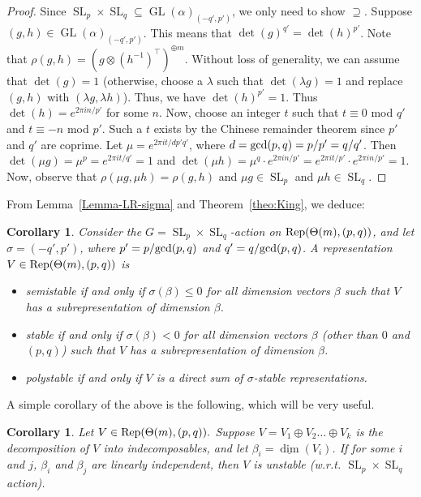 \documentclass[11pt]{amsart}
\newtheorem{corollary}[theorem]{Corollary}
\theoremstyle{definition}
\newcommand{\Rep}{{\rm Rep}}
\newcommand{\GL}{\operatorname{GL}}
\newcommand{\SL}{\operatorname{SL}}
\begin{document}
\begin{proof}
Since $\SL_p \times \SL_q \subseteq \GL(\alpha)_{(-q',p')}$, we only need to show $\supseteq$. Suppose $(g,h) \in \GL(\alpha)_{(-q',p')}$. This means that $\det(g)^{q'} = \det(h)^{p'}$. Note that $\rho(g,h) = (g \otimes (h^{-1})^\top)^{\oplus m}$. Without loss of generality, we can assume that $\det(g) = 1$ (otherwise, choose a $\lambda$ such that $\det(\lambda g ) = 1$ and replace $(g,h)$ with $(\lambda g, \lambda h)$). Thus, we have $\det(h)^{p'} = 1$. Thus $\det(h) = e^{2 \pi i n/p'}$ for some $n$. Now, choose an integer $t$ such that $t \equiv 0$ mod $q'$ and $t \equiv -n$ mod $p'$. Such a $t$ exists by the Chinese remainder theorem since $p'$ and $q'$ are coprime. Let $\mu = e^{2\pi i t/dp'q'}$, where $d = {\rm gcd}(p,q) = p/p' = q/q'$. Then $\det(\mu g) = \mu^p = e^{2\pi i t/q'} = 1$ and $\det(\mu h) = \mu^{q} \cdot e^{2\pi i n/p'}= e^{2\pi i t/p'}\cdot e^{2\pi i n/p'} = 1$. Now, observe that $\rho(\mu g, \mu h) = \rho(g,h)$ and $\mu g \in \SL_p$ and $\mu h \in \SL_q$.



\end{proof}


From Lemma~\ref{Lemma-LR-sigma} and Theorem~\ref{theo:King}, we deduce:


\begin{corollary}
Consider the $G = \SL_p \times \SL_q$-action on $\Rep(\Theta(m),(p,q))$, and let $\sigma = (-q',p')$, where $p' = p/{\rm gcd}(p,q)$ and $q' = q/{\rm gcd}(p,q)$. A representation $V \in \Rep(\Theta(m),(p,q))$ is 
\begin{itemize}
\item semistable if and only if $\sigma(\beta) \leq 0$ for all dimension vectors $\beta$ such that $V$ has a subrepresentation of dimension $\beta$.
\item stable if and only if $\sigma(\beta) < 0$ for all dimension vectors $\beta$ (other than $0$ and $(p,q)$) such that $V$ has a subrepresentation of dimension $\beta$.
\item polystable if and only if $V$ is a direct sum of $\sigma$-stable representations.
\end{itemize}
\end{corollary}

A simple corollary of the above is the following, which will be very useful.

\begin{corollary} \label{lin.ind.unstable}
Let $V \in \Rep(\Theta(m), (p,q)).$ Suppose $V = V_1 \oplus V_2 \dots \oplus V_k$ is the decomposition of $V$ into indecomposables, and let $\beta_i = \underline{\dim}(V_i)$. If for some $i$ and $j$, $\beta_i$ and $\beta_j$ are linearly independent, then $V$ is unstable (w.r.t. $\SL_p \times \SL_q$ action). 
\end{corollary}
\end{document}
